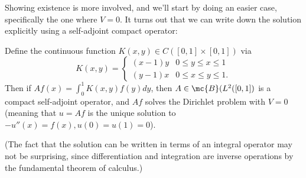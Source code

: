 Showing existence is more involved, and we'll start by doing an easier case, specifically the one where $V = 0$. It turns out that we can write down the solution explicitly using a self-adjoint compact operator:

\begin{theorem}
Define the continuous function $K(x, y) \in C([0, 1] \times [0, 1])$ via
\[
    K(x, y) = \begin{cases} (x-1)y & 0 \le y \le x \le 1 \\ (y-1)x & 0 \le x \le y \le 1. \end{cases}
\]
Then if $Af(x) = \int_0^1 K(x, y) f(y) dy$, then $A \in \mc{B}(L^2([0, 1])$ is a compact self-adjoint operator, and $Af$ solves the Dirichlet problem with $V = 0$ (meaning that $u = Af$ is the unique solution to $-u''(x) = f(x), u(0) = u(1) = 0$). 
\end{theorem}

(The fact that the solution can be written in terms of an integral operator may not be surprising, since differentiation and integration are inverse operations by the fundamental theorem of calculus.)

